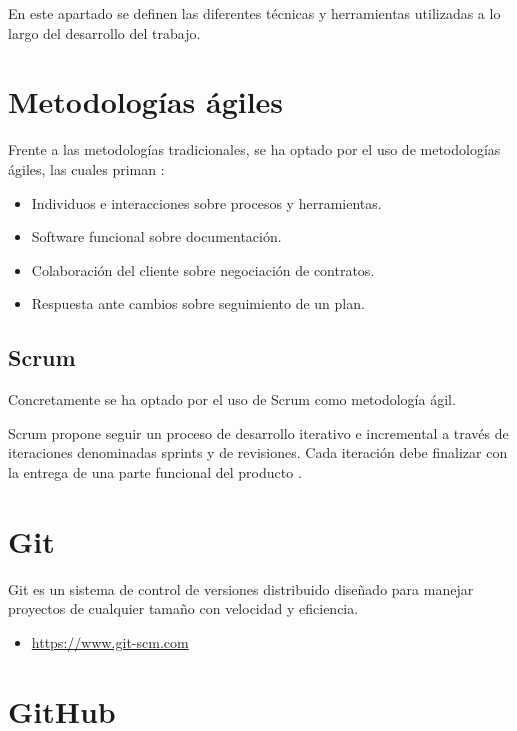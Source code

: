 
En este apartado se definen las diferentes técnicas y herramientas utilizadas a lo largo del desarrollo del trabajo.

\section{Metodologías ágiles}

Frente a las metodologías tradicionales, se ha optado por el uso de metodologías ágiles, las cuales priman \cite{agilealliance:agilemanifesto}:

\begin{itemize}
	\item Individuos e interacciones sobre procesos y herramientas.
	\item Software funcional sobre  documentación.
	\item Colaboración del cliente sobre negociación de contratos.
	\item Respuesta ante cambios sobre seguimiento de un plan.
\end{itemize}

\subsection{Scrum}

Concretamente se ha optado por el uso de Scrum como metodología ágil.

Scrum propone seguir un proceso de desarrollo iterativo e incremental a través de iteraciones denominadas sprints y de revisiones. Cada iteración debe finalizar con la entrega de una parte funcional del producto \cite{scrummanager}.

\section{Git}

Git es un sistema de control de versiones distribuido diseñado para manejar proyectos de cualquier tamaño con velocidad y eficiencia.

\begin{itemize}
	\item \url{https://www.git-scm.com}
\end{itemize}

\section{GitHub}

